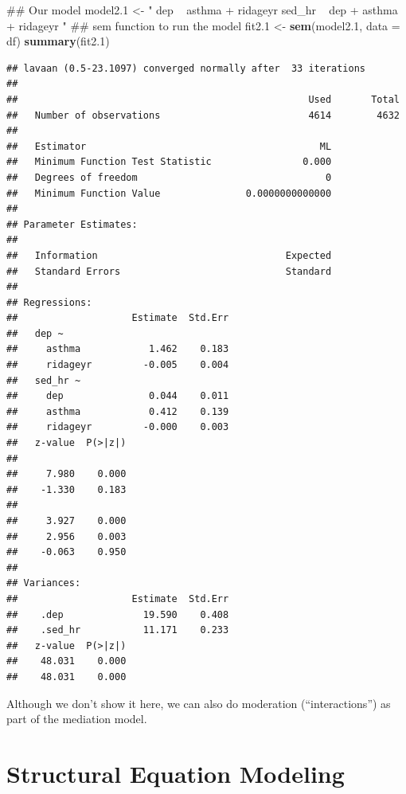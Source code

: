 \documentclass[]{tufte-book}
\newenvironment{Shaded}{}{}
\newcommand{\KeywordTok}[1]{\textcolor[rgb]{0.00,0.44,0.13}{\textbf{#1}}}
\newcommand{\DataTypeTok}[1]{\textcolor[rgb]{0.56,0.13,0.00}{#1}}
\newcommand{\DecValTok}[1]{\textcolor[rgb]{0.25,0.63,0.44}{#1}}
\newcommand{\StringTok}[1]{\textcolor[rgb]{0.25,0.44,0.63}{#1}}
\newcommand{\NormalTok}[1]{#1}
\theoremstyle{definition}
\theoremstyle{definition}
\theoremstyle{remark}
\begin{document}
\begin{Shaded}
\begin{Highlighting}[]
\NormalTok{## Our model}
\NormalTok{model2.}\DecValTok{1}\NormalTok{ <-}\StringTok{ "}
\StringTok{  dep ~ asthma + ridageyr}
\StringTok{  sed_hr ~ dep + asthma + ridageyr}
\StringTok{"}
\NormalTok{## sem function to run the model}
\NormalTok{fit2.}\DecValTok{1}\NormalTok{ <-}\StringTok{ }\KeywordTok{sem}\NormalTok{(model2.}\DecValTok{1}\NormalTok{, }\DataTypeTok{data =}\NormalTok{ df)}
\KeywordTok{summary}\NormalTok{(fit2.}\DecValTok{1}\NormalTok{)}
\end{Highlighting}
\end{Shaded}

\begin{verbatim}
## lavaan (0.5-23.1097) converged normally after  33 iterations
## 
##                                                   Used       Total
##   Number of observations                          4614        4632
## 
##   Estimator                                         ML
##   Minimum Function Test Statistic                0.000
##   Degrees of freedom                                 0
##   Minimum Function Value               0.0000000000000
## 
## Parameter Estimates:
## 
##   Information                                 Expected
##   Standard Errors                             Standard
## 
## Regressions:
##                    Estimate  Std.Err
##   dep ~                             
##     asthma            1.462    0.183
##     ridageyr         -0.005    0.004
##   sed_hr ~                          
##     dep               0.044    0.011
##     asthma            0.412    0.139
##     ridageyr         -0.000    0.003
##   z-value  P(>|z|)
##                   
##     7.980    0.000
##    -1.330    0.183
##                   
##     3.927    0.000
##     2.956    0.003
##    -0.063    0.950
## 
## Variances:
##                    Estimate  Std.Err
##    .dep              19.590    0.408
##    .sed_hr           11.171    0.233
##   z-value  P(>|z|)
##    48.031    0.000
##    48.031    0.000
\end{verbatim}

Although we don't show it here, we can also do moderation
(``interactions'') as part of the mediation model.

\section*{Structural Equation
Modeling}\label{structural-equation-modeling}
\end{document}
